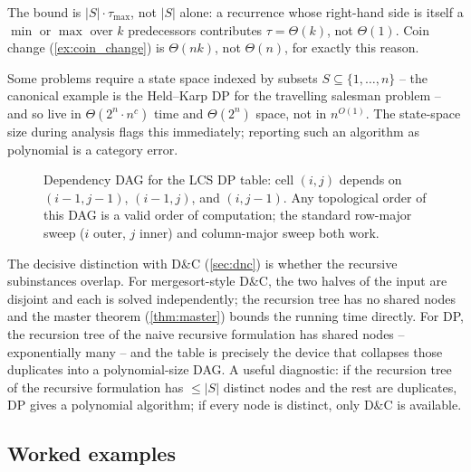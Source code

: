 \begin{remark}
The bound is $|S| \cdot \tau_{\max}$, not $|S|$ alone: a recurrence whose right-hand side is itself a $\min$ or $\max$ over $k$ predecessors contributes $\tau = \Theta(k)$, not $\Theta(1)$. Coin change (\cref{ex:coin_change}) is $\Theta(nk)$, not $\Theta(n)$, for exactly this reason.
\end{remark}

\begin{remark}
Some problems require a state space indexed by subsets $S \subseteq \{1, \dots, n\}$ -- the canonical example is the Held--Karp DP for the travelling salesman problem -- and so live in $\Theta(2^n \cdot n^c)$ time and $\Theta(2^n)$ space, not in $n^{O(1)}$. The state-space size during analysis flags this immediately; reporting such an algorithm as polynomial is a category error.
\end{remark}

\begin{figure}[h]
  \centering
  
  \caption{Dependency DAG for the LCS DP table: cell $(i, j)$ depends on $(i{-}1, j{-}1)$, $(i{-}1, j)$, and $(i, j{-}1)$. Any topological order of this DAG is a valid order of computation; the standard row-major sweep ($i$ outer, $j$ inner) and column-major sweep both work.}
  \label{fig:dp_dag}
\end{figure}

\begin{remark}[DP versus D\&C]
The decisive distinction with D\&C (\cref{sec:dnc}) is whether the recursive subinstances overlap. For mergesort-style D\&C, the two halves of the input are disjoint and each is solved independently; the recursion tree has no shared nodes and the master theorem (\cref{thm:master}) bounds the running time directly. For DP, the recursion tree of the naive recursive formulation has shared nodes -- exponentially many -- and the table is precisely the device that collapses those duplicates into a polynomial-size DAG. A useful diagnostic: if the recursion tree of the recursive formulation has $\le |S|$ distinct nodes and the rest are duplicates, DP gives a polynomial algorithm; if every node is distinct, only D\&C is available.
\end{remark}

\subsection{Worked examples}

